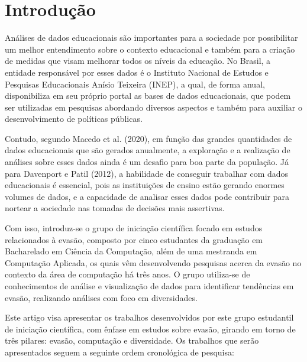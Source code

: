 \documentclass[12pt]{article}
\begin{document}
\section{Introdução}
\label{sec:introducao}

Análises de dados educacionais são importantes para a sociedade por possibilitar um melhor entendimento sobre o contexto educacional e também para a criação de medidas que visam melhorar todos os níveis da educação. No Brasil, a entidade responsável por esses dados é o Instituto Nacional de Estudos e Pesquisas Educacionais Anísio Teixeira (INEP), a qual, de forma anual, disponibiliza em seu próprio portal as bases de dados educacionais, que podem ser utilizadas em pesquisas abordando diversos aspectos e também para auxiliar o desenvolvimento de políticas públicas. 

Contudo, segundo Macedo et al. (2020)\nocite{macedo2020ferramenta}, em função das grandes quantidades de dados educacionais que são gerados anualmente, a exploração e a realização de análises sobre esses dados ainda é um desafio para boa parte da população. Já para Davenport e Patil (2012)\nocite{davenport2012data}, a habilidade de conseguir trabalhar com dados educacionais é essencial, pois as instituições de ensino estão gerando enormes volumes de dados, e a capacidade de analisar esses dados pode contribuir para nortear a sociedade nas tomadas de decisões mais assertivas. 

Com isso, introduz-se o grupo de iniciação científica focado em estudos relacionados à evasão, composto por cinco estudantes da graduação em Bacharelado em Ciência da Computação, além de uma mestranda em Computação Aplicada, os quais vêm desenvolvendo pesquisas acerca da evasão no contexto da área de computação há três anos. O grupo utiliza-se de conhecimentos de análise e visualização de dados para identificar tendências em evasão, realizando análises com foco em diversidades.

Este artigo visa apresentar os trabalhos desenvolvidos por este grupo estudantil de iniciação científica, com ênfase em estudos sobre evasão, girando em torno de três pilares: evasão, computação e diversidade. Os trabalhos que serão apresentados seguem a seguinte ordem cronológica de pesquisa:
\end{document}
